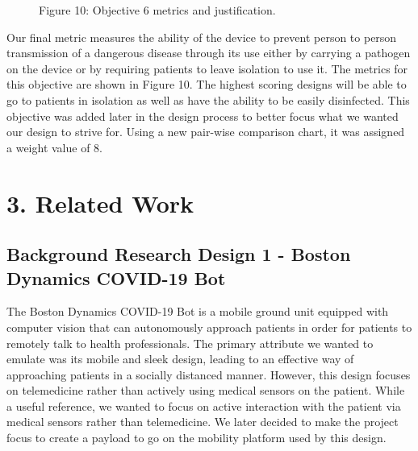﻿\documentclass[10pt]{article}
\begin{document}
%
%	
\begin{figure}
\caption{Figure 10: Objective 6 metrics and justification.}
\label{fig:10}
\end{figure}

Our final metric measures the ability of the device to prevent person to person transmission of a dangerous disease through its use either by carrying a pathogen on the device or by requiring patients to leave isolation to use it. The metrics for this objective are shown in Figure 10. The highest scoring designs will be able to go to patients in isolation as well as have the ability to be easily disinfected. This objective was added later in the design process to better focus what we wanted our design to strive for. Using a new pair-wise comparison chart, it was assigned a weight value of 8.

\section{3. Related Work}
\subsection{Background Research Design 1 - Boston Dynamics COVID-19 Bot}
The Boston Dynamics COVID-19 Bot is a mobile ground unit equipped with computer vision that can autonomously approach patients in order for patients to remotely talk to health professionals. The primary attribute we wanted to emulate was its mobile and sleek design, leading to an effective way of approaching patients in a socially distanced manner. However, this design focuses on telemedicine rather than actively using medical sensors on the patient. While a useful reference, we wanted to focus on active interaction with the patient via medical sensors rather than telemedicine. We later decided to make the project focus to create a payload to go on the mobility platform used by this design.
\end{document}
